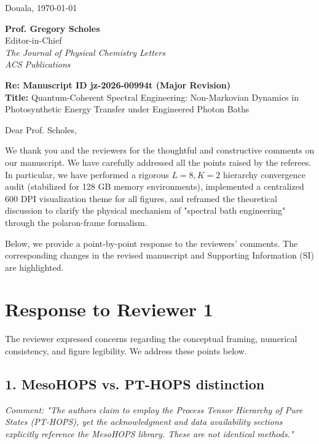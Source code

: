 \documentclass[11pt]{article}
\begin{document}
\begin{flushright}
    Douala, \today
\end{flushright}

\noindent \textbf{Prof. Gregory Scholes}\\
Editor-in-Chief\\
\textit{The Journal of Physical Chemistry Letters}\\
\textit{ACS Publications}

\vspace{1em}

\noindent \textbf{Re: Manuscript ID jz-2026-00994t (Major Revision)}\\
\textbf{Title:} Quantum-Coherent Spectral Engineering: Non-Markovian Dynamics in Photosynthetic Energy Transfer under Engineered Photon Baths

\vspace{2em}

\noindent Dear Prof. Scholes,

\vspace{1.5em}

We thank you and the reviewers for the thoughtful and constructive comments on our manuscript. We have carefully addressed all the points raised by the referees. In particular, we have performed a rigorous $L=8, K=2$ hierarchy convergence audit (stabilized for 128 GB memory environments), implemented a centralized 600 DPI visualization theme for all figures, and reframed the theoretical discussion to clarify the physical mechanism of "spectral bath engineering" through the polaron-frame formalism.

Below, we provide a point-by-point response to the reviewers' comments. The corresponding changes in the revised manuscript and Supporting Information (SI) are highlighted.

\vspace{2em}

\section*{Response to Reviewer 1}

The reviewer expressed concerns regarding the conceptual framing, numerical consistency, and figure legibility. We address these points below.

\subsection*{1. MesoHOPS vs. PT-HOPS distinction}
\textit{Comment: "The authors claim to employ the Process Tensor Hierarchy of Pure States (PT-HOPS), yet the acknowledgment and data availability sections explicitly reference the MesoHOPS library. These are not identical methods."}
\end{document}
